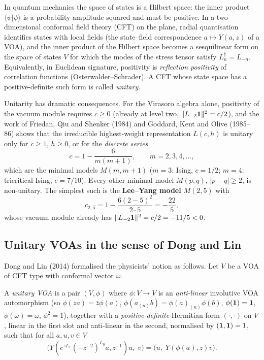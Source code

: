 In quantum mechanics the space of states is a Hilbert space: the inner product
$\langle\psi|\psi\rangle$ is a probability amplitude squared and must be positive. In a
two-dimensional conformal field theory (CFT) on the plane, radial quantisation identifies states
with local fields (the state--field correspondence $a\mapsto Y(a,z)$ of a VOA), and the inner
product of the Hilbert space becomes a sesquilinear form on the space of states $V$ for which the
modes of the stress tensor satisfy $L_n^\dagger = L_{-n}$. Equivalently, in Euclidean signature,
positivity is \emph{reflection positivity} of correlation functions (Osterwalder--Schrader). A CFT
whose state space has a positive-definite such form is called \emph{unitary}.

Unitarity has dramatic consequences. For the Virasoro algebra alone, positivity of the vacuum
module requires $c\ge0$ (already at level two, $\|L_{-2}\mathbf{1}\|^2 = c/2$), and the work of
Friedan, Qiu and Shenker (1984) and Goddard, Kent and Olive (1985--86) shows that the irreducible
highest-weight representation $L(c,h)$ is unitary only for $c\ge1$, $h\ge0$, or for the
\emph{discrete series}
\begin{equation*}
 c = 1-\frac{6}{m(m+1)},\qquad m = 2,3,4,\dots,
\end{equation*}
which are the minimal models $M(m,m+1)$ ($m=3$: Ising, $c=1/2$; $m=4$: tricritical Ising,
$c=7/10$). Every other minimal model $M(p,q)$, $|p-q|\ge2$, is non-unitary. The simplest such is the
\textbf{Lee--Yang model} $M(2,5)$ with
\begin{equation*}
 c_{2,5} = 1 - \frac{6(2-5)^2}{2\cdot5} = -\frac{22}{5},
\end{equation*}
whose vacuum module already has $\|L_{-2}\mathbf{1}\|^2 = c/2 = -11/5 < 0$.

\subsection{Unitary VOAs in the sense of Dong and Lin}

Dong and Lin (2014) formalised the physicists' notion as follows. Let $V$ be a VOA of CFT type with
conformal vector $\omega$.

\begin{definition}\label{l19:def:donglin}
A \emph{unitary VOA} is a pair $(V,\phi)$ where $\phi:V\to V$ is an \emph{anti-linear} involutive
VOA automorphism (so $\phi(za) = \bar z\phi(a)$, $\phi(a_{(n)}b) = \phi(a)_{(n)}\phi(b)$,
$\phi(\mathbf{1})=\mathbf{1}$, $\phi(\omega)=\omega$, $\phi^2=1$), together with a
\emph{positive-definite} Hermitian form $(\cdot,\cdot)$ on $V$, linear in the first slot and
anti-linear in the second, normalised by $(\mathbf{1},\mathbf{1}) = 1$, such that for all $a,u,v\in V$
\begin{equation*}
 \big(Y(e^{zL_1}(-z^{-2})^{L_0}a,z^{-1})u,\;v\big) = \big(u,\;Y(\phi(a),z)v\big).
\end{equation*}
\end{definition}

